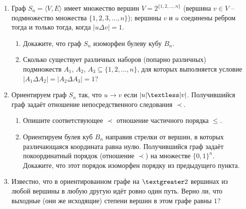 \documentclass[12pt]{article}
\begin{document}
\begin{enumerate}[label={\textbf{\arabic{section}.\arabic*}}]
		\item Граф $S_n = \langle V, E\rangle$ имеет множество вершин $V = 2^{\{1,2,...,n\}}$ (вершина $v\in V$ -- подмножество множества $\{1, 2, 3, . . . , n\}$); вершины $v$ и $u$ соединены ребром тогда и только тогда, когда $|u\Delta v| = 1$.
		\begin{enumerate}[label=\textbf{\alph*)}]
			\item Докажите, что граф $S_n$ изоморфен булеву кубу $B_n$.
			\item Сколько существует различных наборов (попарно различных) подмножеств $A_1$, $A_2$, $A_3\subseteq \{1, 2,\dots, n\}$, для которых выполняется условие $|A_1\Delta A_2| = |A_2\Delta A_3| = 1$?
		\end{enumerate}
		
		\item Ориентируем граф $S_n$ так, что $u\rightarrow v$ если $|u| \textless |v|$. Получившийся граф задаёт отношение непосредственного следования $\prec$.
		\begin{enumerate}[label=\textbf{\alph*)}]
			\item Опишите соответствующее $\prec$ отношение частичного порядка $\leqslant$.
			\item Ориентируем булев куб $B_n$ направив стрелки от вершин, в которых различающаяся координата равна нулю. Получившийся граф задаёт покоординатный порядок (отношение $\prec$) на множестве $\{0, 1\}^n$. Докажите, что этот порядок изоморфен порядку из предыдущего пункта.

		\end{enumerate}
	
		\item Известно, что в ориентированном графе на $\textgreater 2$ вершинах из любой вершины в любую другую идёт ровно один путь. Верно ли, что выходные (они же исходящие) степени вершин в этом графе равны $1$?

	\end{enumerate}
	\newpage
\end{document}
